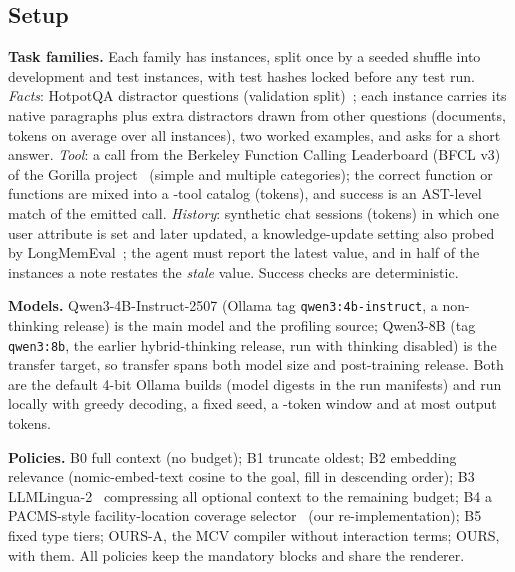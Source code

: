 \subsection{Setup}
\textbf{Task families.} Each family has \RNPerFamily instances, split once by a seeded shuffle into \RNDev development
and \RNTest test instances, with test hashes locked before any test run. \emph{Facts}: HotpotQA distractor questions
(validation split)~\citep{hotpotqa2018}; each instance carries its native paragraphs plus extra distractors drawn from other
questions (\RNumDocs documents, \RFullTokFacts tokens on average over all instances), two worked examples, and asks for a short answer.
\emph{Tool}: a call from the Berkeley Function Calling Leaderboard (BFCL v3) of the Gorilla project~\citep{gorilla2023} (simple and multiple categories); the
correct function or functions are mixed into a \RNumTools-tool catalog (\RFullTokTool tokens), and success is an
AST-level match of the emitted call. \emph{History}: \RNumSessions synthetic chat sessions (\RFullTokHistory tokens)
in which one user attribute is set and later updated, a knowledge-update setting also probed by
LongMemEval~\citep{longmemeval2024}; the agent must report the latest value, and in half of the
instances a note restates the \emph{stale} value. Success checks are deterministic.

\textbf{Models.} Qwen3-4B-Instruct-2507 (Ollama tag \texttt{qwen3:4b-instruct}, a non-thinking release) is the main
model and the profiling source; Qwen3-8B (tag \texttt{qwen3:8b}, the earlier hybrid-thinking release, run with thinking
disabled) is the transfer target, so transfer spans both model size and post-training release. Both are the default
4-bit Ollama builds (model digests in the run manifests) and run locally with greedy decoding, a fixed seed, a
\RNumCtx-token window and at most \RNumPredict output tokens.

\textbf{Policies.} B0 full context (no budget); B1 truncate oldest; B2 embedding relevance (nomic-embed-text cosine to
the goal, fill in descending order); B3 LLMLingua-2~\citep{llmlingua2_2024} compressing all optional context to the
remaining budget; B4 a PACMS-style facility-location coverage selector~\citep{pacms2026} (our re-implementation); B5 fixed
type tiers; OURS-A, the MCV compiler without interaction terms; OURS, with them. All policies keep the mandatory blocks
and share the renderer.

